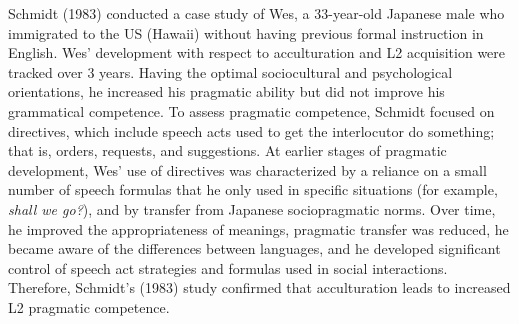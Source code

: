 \documentclass[12pt]{article}
\newenvironment{styleStandard}{\setlength\leftskip{0cm}\setlength\rightskip{0cm plus 1fil}\setlength\parindent{0cm}\setlength\parfillskip{0pt plus 1fil}\setlength\parskip{0in plus 1pt}\writerlistparindent\writerlistleftskip\leavevmode\normalfont\normalsize\writerlistlabel\ignorespaces}{\unskip\vspace{0.111in plus 0.0111in}\par}
\newcommand\writerlistleftskip{}
\newcommand\writerlistparindent{}
\newcommand\writerlistlabel{}
\begin{document}
\begin{styleStandard}
Schmidt (1983) conducted a case study of Wes, a 33-year-old Japanese male who immigrated to the US (Hawaii) without having previous formal instruction in English. Wes’ development with respect to acculturation and L2 acquisition were tracked over 3 years. Having the optimal sociocultural and psychological orientations, he increased his pragmatic ability but did not improve his grammatical competence. To assess pragmatic competence, Schmidt focused on directives, which include speech acts used to get the interlocutor do something; that is, orders, requests, and suggestions. At earlier stages of pragmatic development, Wes’ use of directives was characterized by a reliance on a small number of speech formulas that he only used in specific situations (for example, \textit{shall we go?}), and by transfer from Japanese sociopragmatic norms. Over time, he improved the appropriateness of meanings, pragmatic transfer was reduced, he became aware of the differences between languages, and he developed significant control of speech act strategies and formulas used in social interactions. Therefore, Schmidt’s (1983) study confirmed that acculturation leads to increased L2 pragmatic competence.
\end{styleStandard}
\end{document}
